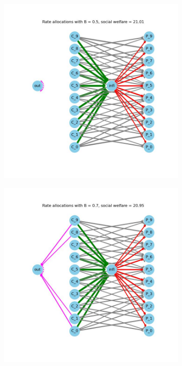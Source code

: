 \documentclass[11pt, letterpaper]{article}
\begin{document}
\begin{figure}[h]
\begin{adjustbox}{max width=1.5\textwidth,center}
    \centering
    \begin{subfigure}[b]{0.45\textwidth}
      \includegraphics[width=\linewidth]{figures/B_0/0.5_allocs.jpg}
    \end{subfigure}
    \begin{subfigure}[b]{0.45\textwidth}
      \includegraphics[width=\linewidth]{figures/B_0/0.7_allocs.jpg}

\end{subfigure}
\end{adjustbox}
\end{figure}
\end{document}
